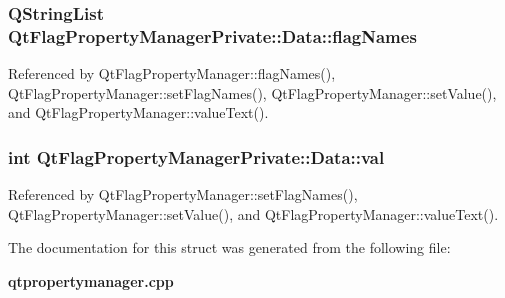 \subsubsection[{flag\+Names}]{\setlength{\rightskip}{0pt plus 5cm}Q\+String\+List Qt\+Flag\+Property\+Manager\+Private\+::\+Data\+::flag\+Names}\label{structQtFlagPropertyManagerPrivate_1_1Data_ae2d2eec2b44d2bb7d7f31099bddfc7ae}


Referenced by Qt\+Flag\+Property\+Manager\+::flag\+Names(), Qt\+Flag\+Property\+Manager\+::set\+Flag\+Names(), Qt\+Flag\+Property\+Manager\+::set\+Value(), and Qt\+Flag\+Property\+Manager\+::value\+Text().

\subsubsection[{val}]{\setlength{\rightskip}{0pt plus 5cm}int Qt\+Flag\+Property\+Manager\+Private\+::\+Data\+::val}\label{structQtFlagPropertyManagerPrivate_1_1Data_a42c5c8e802448ba49363ab1f98b4e2b1}


Referenced by Qt\+Flag\+Property\+Manager\+::set\+Flag\+Names(), Qt\+Flag\+Property\+Manager\+::set\+Value(), and Qt\+Flag\+Property\+Manager\+::value\+Text().



The documentation for this struct was generated from the following file\+:\begin{DoxyCompactItemize}
\item 
{\bf qtpropertymanager.\+cpp}\end{DoxyCompactItemize}
